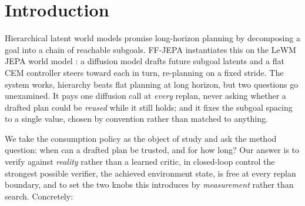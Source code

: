 \documentclass{article}
\begin{document}
\section{Introduction}
\label{sec:intro}
Hierarchical latent world models promise long-horizon planning by decomposing a goal
into a chain of reachable subgoals. FF-JEPA \citep{ffjepa} instantiates this on the
LeWM JEPA world model \citep{lewm}: a diffusion model drafts future subgoal latents
and a flat CEM controller \citep{cem} steers toward each in turn, re-planning on a
fixed stride. The system works, hierarchy beats flat planning at long horizon, but two questions go unexamined. It pays one diffusion call at \emph{every} replan,
never asking whether a drafted plan could be \emph{reused} while it still holds; and
it fixes the subgoal spacing to a single value, chosen by convention rather than
matched to anything.

We take the consumption policy as the object of study and ask the method question:
when can a drafted plan be trusted, and for how long? Our answer is to verify against
\emph{reality} rather than a learned critic, in closed-loop control the strongest
possible verifier, the achieved environment state, is free at every replan boundary, and to set the two knobs this introduces by \emph{measurement} rather than search.
Concretely:
\end{document}
